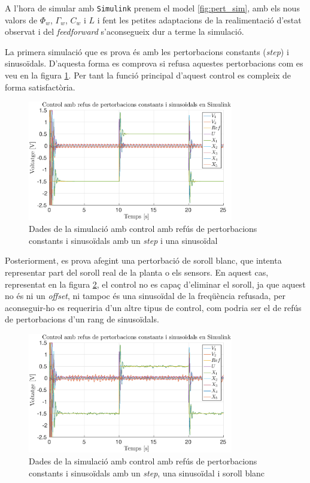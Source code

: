 \documentclass[12pt,a4paper,final,twoside,openright]{report}
\begin{document}
A l'hora de simular amb \texttt{Simulink} prenem el model \eqref{fig:pert_sim}, amb els nous valors de $\Phi_w$, $\Gamma_w$, $C_w$ i $L$ i fent les petites adaptacions de la realimentació d'estat observat i del \textit{feedforward} s'aconsegueix dur a terme la simulació.

La primera simulació que es prova és amb les pertorbacions constants (\textit{step}) i sinusoïdals. D'aquesta forma es comprova si refusa aquestes pertorbacions com es veu en la figura \ref{fig:pert_sin_ct_sim_pols_imag_no_soroll}. Per tant la funció principal d'aquest control es compleix de forma satisfactòria.

\begin{figure}[h]
\centering
\includegraphics[width=0.8\textwidth]{Imatges/pert_sin_ct_sim_pols_imag_no_soroll.eps}
\caption{Dades de la simulació amb control amb refús de pertorbacions constants i sinusoïdals amb un \textit{step} i una sinusoïdal\label{fig:pert_sin_ct_sim_pols_imag_no_soroll}}
\end{figure}

Posteriorment, es prova afegint una pertorbació de soroll blanc, que intenta representar part del soroll real de la planta o els sensors. En aquest cas, representat en la figura \ref{fig:pert_sin_ct_sim_pols_imag_soroll}, el control no es capaç d'eliminar el soroll, ja que aquest no és ni un \textit{offset}, ni tampoc és una sinusoïdal de la freqüència refusada, per aconseguir-ho es requeriria d'un altre tipus de control, com podria ser el de refús de pertorbacions d'un rang de sinusoïdals.

\begin{figure}[h]
\centering
\includegraphics[width=0.8\textwidth]{Imatges/pert_sin_ct_sim_pols_imag_soroll.eps}
\caption{Dades de la simulació amb control amb refús de pertorbacions constants i sinusoïdals amb un \textit{step}, una sinusoïdal i soroll blanc\label{fig:pert_sin_ct_sim_pols_imag_soroll}}
\end{figure}
\end{document}
